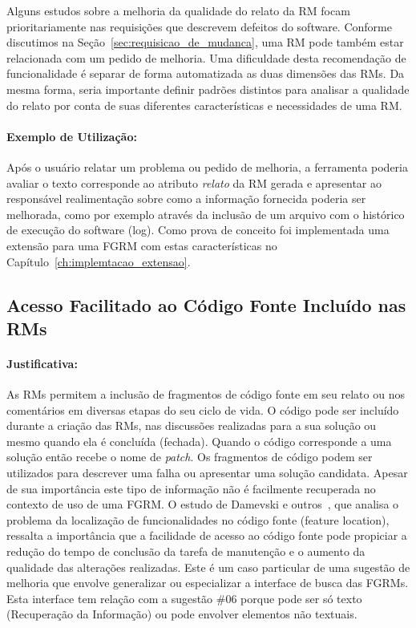 Alguns estudos sobre a melhoria da qualidade do relato da RM focam
prioritariamente nas requisições que descrevem defeitos do software. Conforme
discutimos na Seção~\ref{sec:requisicao_de_mudanca}, uma RM pode também estar
relacionada com um pedido de melhoria. Uma dificuldade desta recomendação de
funcionalidade é separar de forma automatizada as duas dimensões das RMs. Da
mesma forma, seria importante definir padrões distintos para analisar a
qualidade do relato por conta de suas diferentes características e necessidades
de uma RM\@.

\paragraph{Exemplo de Utilização:}
\label{par:exemplo_s01}

Após o usuário relatar um problema ou pedido de melhoria, a ferramenta poderia
avaliar o texto corresponde ao atributo \textit{relato} da RM gerada e
apresentar ao responsável realimentação sobre como a informação fornecida
poderia ser melhorada, como por exemplo através da inclusão de um arquivo com o
histórico de execução do software (log). Como prova de conceito foi
implementada uma extensão para uma FGRM com estas características no
Capítulo~\ref{ch:implemtacao_extensao}.

\subsection{Acesso Facilitado ao Código Fonte Incluído nas RMs}
\label{sub:busca_por_código_fonte}


\paragraph{Justificativa:}
\label{par:justificativa_s02}

As RMs permitem a inclusão de fragmentos de código fonte em seu relato ou nos
comentários em diversas etapas do seu ciclo de vida. O código pode ser incluído
durante a criação das RMs, nas discussões realizadas para a sua solução ou
mesmo quando ela é concluída (fechada). Quando o código corresponde a uma
solução então recebe o nome de \textit{patch}. Os fragmentos de código podem
ser utilizados para descrever uma falha ou apresentar uma solução candidata.
Apesar de sua importância este tipo de informação não é facilmente recuperada
no contexto de uso de uma FGRM\@. O estudo de Damevski e
outros~\cite{damevski2016field}, que analisa o problema da localização de
funcionalidades no código fonte (feature location), ressalta a importância que
a facilidade de acesso ao código fonte pode propiciar a redução do tempo de
conclusão da tarefa de manutenção e o aumento da qualidade das alterações
realizadas. Este é um caso particular de uma sugestão de melhoria que envolve
generalizar ou especializar a interface de busca das FGRMs. Esta interface tem
relação com a sugestão \#06 porque pode ser só texto (Recuperação da
Informação) ou pode envolver elementos não textuais.

